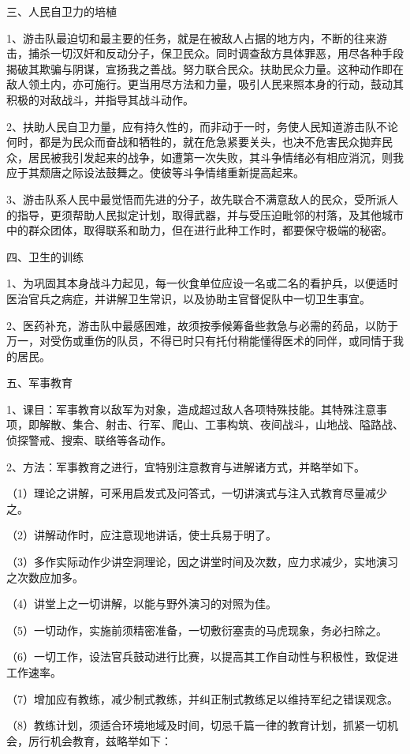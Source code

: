 三、人民自卫力的培植

1、游击队最迫切和最主要的任务，就是在被敌人占据的地方内，不断的往来游击，捕杀一切汉奸和反动分子，保卫民众。同时调查敌方具体罪恶，用尽各种手段揭破其欺骗与阴谋，宣扬我之善战。努力联合民众。扶助民众力量。这种动作即在敌人领土内，亦可施行。更当用尽方法和力量，吸引人民来照本身的行动，鼓动其积极的对敌战斗，并指导其战斗动作。

2、扶助人民自卫力量，应有持久性的，而非动于一时，务使人民知道游击队不论何时，都是为民众而奋战和牺牲的，就在危急紧要关头，也决不危害民众拋弃民众，居民被我引发起来的战争，如遭第一次失败，其斗争情绪必有相应消沉，则我应于其颓唐之际设法鼓舞之。使彼等斗争情绪重新提高起来。

3、游击队系人民中最觉悟而先进的分子，故先联合不满意敌人的民众，受所派人的指导，更须帮助人民拟定计划，取得武器，并与受压迫毗邻的村落，及其他城市中的群众团体，取得联系和助力，但在进行此种工作时，都要保守极端的秘密。

四、卫生的训练

1、为巩固其本身战斗力起见，每一伙食单位应设一名或二名的看护兵，以便适时医治官兵之病症，并讲解卫生常识，以及协助主官督促队中一切卫生事宜。

2、医药补充，游击队中最感困难，故须按季候筹备些救急与必需的药品，以防于万一，对受伤或重伤的队员，不得已时只有托付稍能懂得医术的同伴，或同情于我的居民。

五、军事教育

1、课目：军事教育以敌军为对象，造成超过敌人各项特殊技能。其特殊注意事项，即解散、集合、射击、行军、爬山、工事构筑、夜间战斗，山地战、隘路战、侦探警戒、搜索、联络等各动作。

2、方法：军事教育之进行，宜特别注意教育与进解诸方式，并略举如下。

（1）理论之讲解，可釆用启发式及问答式，一切讲演式与注入式教育尽量减少之。

（2）讲解动作时，应注意现地讲话，使士兵易于明了。

（3）多作实际动作少讲空洞理论，因之讲堂时间及次数，应力求减少，实地演习之次数应加多。

（4）讲堂上之一切讲解，以能与野外演习的对照为佳。

（5）一切动作，实施前须精密准备，一切敷衍塞责的马虎现象，务必扫除之。

（6）一切工作，设法官兵鼓动进行比赛，以提高其工作自动性与积极性，致促进工作速率。

（7）增加应有教练，减少制式教练，并纠正制式教练足以维持军纪之错误观念。

（8）教练计划，须适合环境地域及时间，切忌千篇一律的教育计划，抓紧一切机会，厉行机会教育，兹略举如下：

